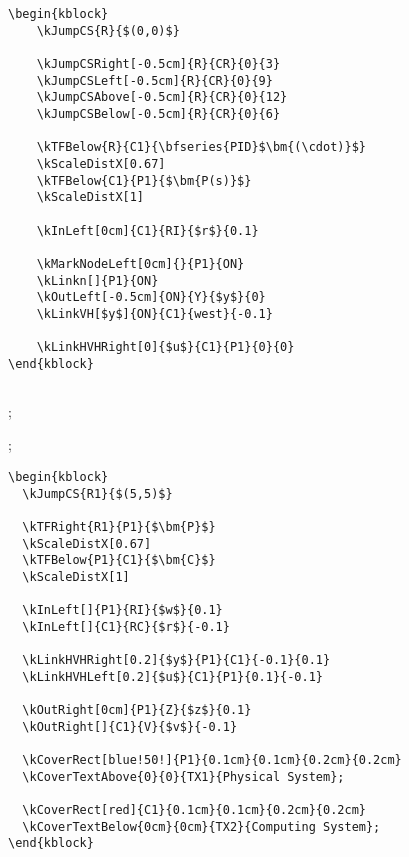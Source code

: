 \documentclass[onecolumn,a4paper,10pt]{IEEEtran}
\newcommand*{\spacetweak}{\medskip\medskip}
\begin{document}
\begin{lstlisting}
\begin{kblock}
    \kJumpCS{R}{$(0,0)$}

    \kJumpCSRight[-0.5cm]{R}{CR}{0}{3}
    \kJumpCSLeft[-0.5cm]{R}{CR}{0}{9}
    \kJumpCSAbove[-0.5cm]{R}{CR}{0}{12}
    \kJumpCSBelow[-0.5cm]{R}{CR}{0}{6}

    \kTFBelow{R}{C1}{\bfseries{PID}$\bm{(\cdot)}$}
    \kScaleDistX[0.67]
    \kTFBelow{C1}{P1}{$\bm{P(s)}$}
    \kScaleDistX[1]

    \kInLeft[0cm]{C1}{RI}{$r$}{0.1}

    \kMarkNodeLeft[0cm]{}{P1}{ON}
    \kLinkn[]{P1}{ON}
    \kOutLeft[-0.5cm]{ON}{Y}{$y$}{0}
    \kLinkVH[$y$]{ON}{C1}{west}{-0.1}

    \kLinkHVHRight[0]{$u$}{C1}{P1}{0}{0}
\end{kblock}
\end{lstlisting}
\spacetweak

\subsection{}\spacetweak

\begin{kblock}

  \kScaleDistX[0.67]
  \kScaleDistX[1]




  ;

  ;
\end{kblock}

\begin{lstlisting}
\begin{kblock}
  \kJumpCS{R1}{$(5,5)$}

  \kTFRight{R1}{P1}{$\bm{P}$}
  \kScaleDistX[0.67]
  \kTFBelow{P1}{C1}{$\bm{C}$}
  \kScaleDistX[1]

  \kInLeft[]{P1}{RI}{$w$}{0.1}
  \kInLeft[]{C1}{RC}{$r$}{-0.1}

  \kLinkHVHRight[0.2]{$y$}{P1}{C1}{-0.1}{0.1}
  \kLinkHVHLeft[0.2]{$u$}{C1}{P1}{0.1}{-0.1}

  \kOutRight[0cm]{P1}{Z}{$z$}{0.1}
  \kOutRight[]{C1}{V}{$v$}{-0.1}

  \kCoverRect[blue!50!]{P1}{0.1cm}{0.1cm}{0.2cm}{0.2cm}
  \kCoverTextAbove{0}{0}{TX1}{Physical System};

  \kCoverRect[red]{C1}{0.1cm}{0.1cm}{0.2cm}{0.2cm}
  \kCoverTextBelow{0cm}{0cm}{TX2}{Computing System};
\end{kblock}
\end{lstlisting}
\end{document}
